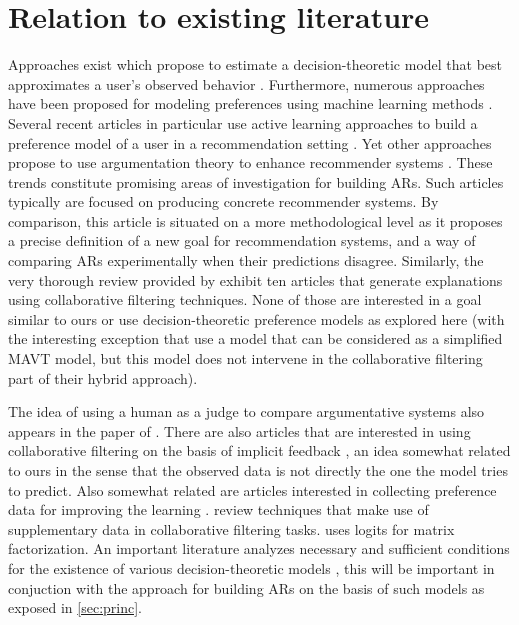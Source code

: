 \documentclass[version=3.21, pagesize, twoside=off, bibliography=totoc, DIV=calc, fontsize=12pt, a4paper, french, english]{scrartcl}
\begin{document}
\section{Relation to existing literature}
\label{sec:litt}
Approaches exist which propose to estimate a decision-theoretic model that best approximates a user’s observed behavior \citep{greco_trends_2010, sobrie_learning_2018}. 
Furthermore, numerous approaches have been proposed for modeling preferences using machine learning methods \citep{furnkranz_preference_2010}. 
Several recent articles in particular use active learning approaches to build a preference model of a user in a recommendation setting \citep{teso_constructive_2016, teso_coactive_2017, dragone_constructive_2018, erculiani_automating_2018, dragone_no_2018}.
Yet other approaches propose to use argumentation theory \citep{besnard_elements_2008} to enhance recommender systems \citep{chesnevar_empowering_2009, rago_argumentation-based_2018}. These trends constitute promising areas of investigation for building \acp{AR}. Such articles typically are focused on producing concrete recommender systems. By comparison, this article is situated on a more methodological level as it proposes a precise definition of a new goal for recommendation systems, and a way of comparing \acp{AR} experimentally when their predictions disagree. Similarly, the very thorough review provided by \citet{nunes_systematic_2017} exhibit ten articles that generate explanations using collaborative filtering techniques. None of those are interested in a goal similar to ours or use decision-theoretic preference models as explored here (with the interesting exception that \citet{marx_increasing_2010} use a model that can be considered as a simplified MAVT model, but this model does not intervene in the collaborative filtering part of their hybrid approach).

The idea of using a human as a judge to compare argumentative systems also appears in the paper of \citet{irving_ai_2018}.
There are also articles that are interested in using collaborative filtering on the basis of implicit feedback \citep{rendle_bpr:_2009, hu_collaborative_2008}, an idea somewhat related to ours in the sense that the observed data is not directly the one the model tries to predict.
Also somewhat related are articles interested in collecting preference data for improving the learning \citep{sepliarskaia_preference_2018}. \citet{chen_attribute-aware_2018} review techniques that make use of supplementary data in collaborative filtering tasks.
\citet{johnson_logistic_2014} uses logits for matrix factorization. 
An important literature analyzes necessary and sufficient conditions for the existence of various decision-theoretic models \citep{krantz_foundations_1971, gonzales_additive_1996, bouyssou_consolidated_2015}, this will be important in conjuction with the approach for building \acp{AR} on the basis of such models as exposed in \cref{sec:princ}.
\end{document}

